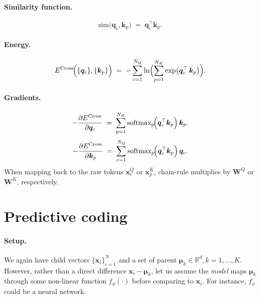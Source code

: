 \documentclass{article}
\begin{document}
    \paragraph{Similarity function.}
    \[
    \mathrm{sim}\bigl(\bm{q}_c, \bm{k}_p\bigr)
    \;=\;
    \bm{q}_c^\top \bm{k}_p.
    \]
    
    \paragraph{Energy.}
    \begin{equation}
    E^{\mathrm{Cross}}\!\Bigl(\{\bm{q}_c\}, \{\bm{k}_p\}\Bigr)
    \;=\;
    -\sum_{c=1}^{N_Q}
    \ln \Bigl(\sum_{p=1}^{N_K}
    \exp\bigl(\bm{q}_c^\top\,\bm{k}_p\bigr)\Bigr).
    \end{equation}
    
    \paragraph{Gradients.}
    \begin{equation}
    -\frac{\partial E^{\mathrm{Cross}}}{\partial \bm{q}_c}
    \;=\;
    \sum_{p=1}^{N_K}
    \text{softmax}_{p}\!\Bigl(\bm{q}_c^\top \bm{k}_p \Bigr)\,
    \bm{k}_p.
    \end{equation}
    \begin{equation}
    -\frac{\partial E^{\mathrm{Cross}}}{\partial \bm{k}_p}
    \;=\;
    \sum_{c=1}^{N_Q}
    \text{softmax}_{p}\!\Bigl(\bm{q}_c^\top \bm{k}_p \Bigr)\,
    \bm{q}_c.
    \end{equation}
    When mapping back to the raw tokens \(\bm{x}^Q_c\) or \(\bm{x}^K_p\), chain-rule multiplies by \(\bm{W}^Q\) or \(\bm{W}^K\), respectively.
    



\section{Predictive coding}

\paragraph{Setup.}
We again have child vectors \(\{\bm{x}_i\}_{i=1}^N\) and a set of parent \(\bm{\mu}_k \in \mathbb{R}^d, k=1,\dots,K\).  However, rather than a direct difference \(\bm{x}_i-\bm{\mu}_k\), let us assume the \emph{model} maps \(\bm{\mu}_k\) through some non-linear function \(f_\phi(\cdot)\) before comparing to \(\bm{x}_i\).  For instance, \(f_\phi\) could be a neural network.
\end{document}
